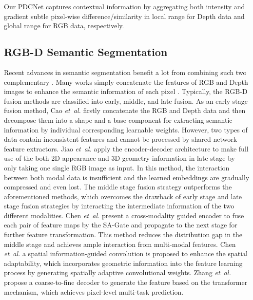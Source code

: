 \documentclass[lettersize,journal]{IEEEtran}
\begin{document}
Our PDCNet captures contextual information by aggregating both intensity and gradient subtle pixel-wise difference/similarity in local range for Depth data and global range for RGB data, respectively.

\subsection{RGB-D Semantic Segmentation} 
Recent advances in semantic segmentation benefit a lot from combining such two complementary \cite{ren2012rgb,silberman2012indoor,jiao2019geometry,cao2021shapeconv,gupta2013perceptual,khan2016integrating}. Many works simply concatenate the features of RGB and Depth images to enhance the semantic information of each pixel \cite{silberman2012indoor,ren2012rgb}. Typically, the RGB-D fusion methods are classified into early, middle, and late fusion. As an early stage fusion method, Cao \textit{et~al.} \cite{cao2021shapeconv} firstly concatenate the RGB and Depth data and then decompose them into a shape and a base component for extracting semantic information by individual corresponding learnable weights. However, two types of data contain inconsistent features and cannot be processed by shared network feature extractors. Jiao \textit{et~al.} \cite{jiao2019geometry} apply the encoder-decoder architecture to make
full use of the both 2D appearance and 3D geometry information in late stage by only taking one single RGB image
as input. In this method, the interaction between both modal data is insufficient and the learned embeddings are gradually compressed and even lost. The middle stage fusion strategy outperforms the aforementioned methods, which overcomes the drawback of early stage and late stage fusion strategies by interacting the intermediate information of the two different modalities. Chen \textit{et~al.} \cite{chen2020bi} present a cross-modality guided encoder to fuse each pair of
feature maps by the SA-Gate and propagate to the next stage for further feature transformation. This method reduces the distribution gap in the middle stage and achieves ample interaction from multi-modal features. Chen \textit{et~al.} \cite{chen2021spatial} a spatial information-guided convolution is proposed to enhance the spatial adaptability, which incorporates geometric information into the feature learning
process by generating spatially adaptive convolutional weights. Zhang \textit{et~al.} \cite{zhang2022tube} propose a coarse-to-fine decoder to generate the feature based on the transformer mechanism, which achieves pixel-level
multi-task prediction.
\end{document}
